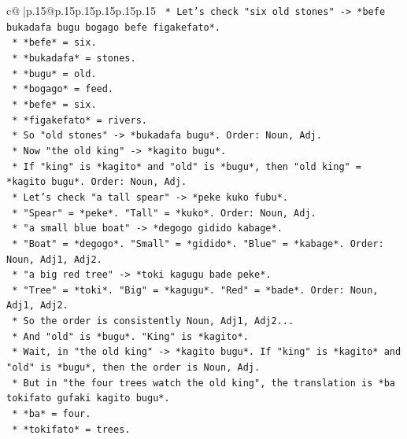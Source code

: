 \documentclass{article}
\begin{document}
{\begin{supertabular}{c@{$\;$}|p{.15\linewidth}@{}p{.15\linewidth}p{.15\linewidth}p{.15\linewidth}p{.15\linewidth}p{.15\linewidth}}
{{{\texttt{            *   Let's check "six old stones" {-}> *befe bukadafa bugu bogago befe figakefato*.} \\
\texttt{                *   *befe* = six.} \\
\texttt{                *   *bukadafa* = stones.} \\
\texttt{                *   *bugu* = old.} \\
\texttt{                *   *bogago* = feed.} \\
\texttt{                *   *befe* = six.} \\
\texttt{                *   *figakefato* = rivers.} \\
\texttt{                *   So "old stones" {-}> *bukadafa bugu*. Order: Noun, Adj.} \\
\texttt{            *   Now "the old king" {-}> *kagito bugu*.} \\
\texttt{                *   If "king" is *kagito* and "old" is *bugu*, then "old king" = *kagito bugu*. Order: Noun, Adj.} \\
\texttt{            *   Let's check "a tall spear" {-}> *peke kuko fubu*.} \\
\texttt{                *   "Spear" = *peke*. "Tall" = *kuko*. Order: Noun, Adj.} \\
\texttt{            *   "a small blue boat" {-}> *degogo gidido kabage*.} \\
\texttt{                *   "Boat" = *degogo*. "Small" = *gidido*. "Blue" = *kabage*. Order: Noun, Adj1, Adj2.} \\
\texttt{            *   "a big red tree" {-}> *toki kagugu bade peke*.} \\
\texttt{                *   "Tree" = *toki*. "Big" = *kagugu*. "Red" = *bade*. Order: Noun, Adj1, Adj2.} \\
\texttt{            *   So the order is consistently Noun, Adj1, Adj2...} \\
\texttt{            *   And "old" is *bugu*. "King" is *kagito*.} \\
\texttt{            *   Wait, in "the old king" {-}> *kagito bugu*. If "king" is *kagito* and "old" is *bugu*, then the order is Noun, Adj.} \\
\texttt{            *   But in "the four trees watch the old king", the translation is *ba tokifato gufaki kagito bugu*.} \\
\texttt{                *   *ba* = four.} \\
\texttt{                *   *tokifato* = trees.} \\
}}}
\end{supertabular}}
\end{document}
